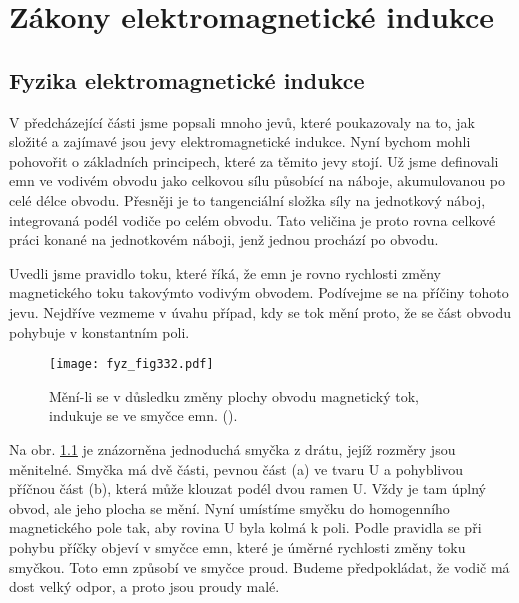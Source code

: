 {
\chapter{Zákony elektromagnetické indukce}\label{fyz:IIchapXVII}
\minitoc

\section{Fyzika elektromagnetické indukce}\label{fyz:IIchapXVIIsecI}
  V předcházející části jsme popsali mnoho jevů, které poukazovaly na to, jak složité a zajímavé 
  jsou jevy elektromagnetické indukce. Nyní bychom mohli pohovořit o základních principech, které 
  za těmito jevy stojí. Už jsme definovali emn ve vodivém obvodu jako celkovou sílu působící na 
  náboje, akumulovanou po celé délce obvodu. Přesněji je to tangenciální složka síly na jednotkový 
  náboj, integrovaná podél vodiče po celém obvodu. Tato veličina je proto rovna celkové práci 
  konané na jednotkovém náboji, jenž jednou prochází po obvodu.
  
  Uvedli jsme pravidlo toku, které říká, že emn je rovno rychlosti změny magnetického toku 
  takovýmto vodivým obvodem. Podívejme se na příčiny tohoto jevu. Nejdříve vezmeme v úvahu případ, 
  kdy se tok mění proto, že se část obvodu pohybuje v konstantním poli.

  \begin{figure}[ht!]  %
    \centering
    \texttt{[image: fyz\_fig332.pdf]}
    \caption{Mění-li se v důsledku změny plochy obvodu magnetický tok, indukuje se ve smyčce emn. 
             (\cite[s.~294]{Feynman02}).}
    \label{fyz:fig332}
  \end{figure}
  
  Na obr. \ref{fyz:fig332} je znázorněna jednoduchá smyčka z drátu, jejíž rozměry jsou měnitelné. 
  Smyčka má dvě části, pevnou část (a) ve tvaru U a pohyblivou příčnou část (b), která může klouzat 
  podél dvou ramen U. Vždy je tam úplný obvod, ale jeho plocha se mění. Nyní umístíme smyčku do 
  homogenního magnetického pole tak, aby rovina U byla kolmá k poli. Podle pravidla se při pohybu 
  příčky objeví v smyčce emn, které je úměrné rychlosti změny toku smyčkou. Toto emn způsobí ve 
  smyčce proud. Budeme předpokládat, že vodič má dost velký odpor, a proto jsou proudy malé.
  
}
